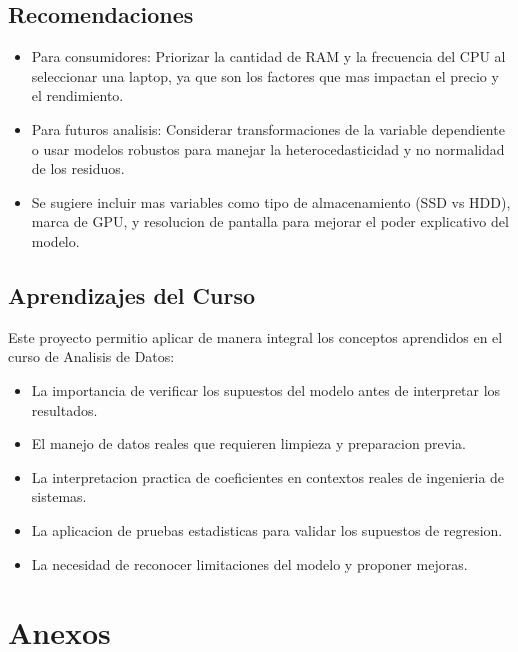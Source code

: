 \documentclass[12pt,a4paper]{article}
\begin{document}
\subsection{Recomendaciones}

\begin{itemize}[leftmargin=1.5cm]
    \item Para consumidores: Priorizar la cantidad de RAM y la frecuencia del CPU al seleccionar una laptop, ya que son los factores que mas impactan el precio y el rendimiento.
    
    \item Para futuros analisis: Considerar transformaciones de la variable dependiente o usar modelos robustos para manejar la heterocedasticidad y no normalidad de los residuos.
    
    \item Se sugiere incluir mas variables como tipo de almacenamiento (SSD vs HDD), marca de GPU, y resolucion de pantalla para mejorar el poder explicativo del modelo.
\end{itemize}

\subsection{Aprendizajes del Curso}

Este proyecto permitio aplicar de manera integral los conceptos aprendidos en el curso de Analisis de Datos:

\begin{itemize}[leftmargin=1.5cm]
    \item La importancia de verificar los supuestos del modelo antes de interpretar los resultados.
    \item El manejo de datos reales que requieren limpieza y preparacion previa.
    \item La interpretacion practica de coeficientes en contextos reales de ingenieria de sistemas.
    \item La aplicacion de pruebas estadisticas para validar los supuestos de regresion.
    \item La necesidad de reconocer limitaciones del modelo y proponer mejoras.
\end{itemize}

\newpage
\section{Anexos}
\end{document}
